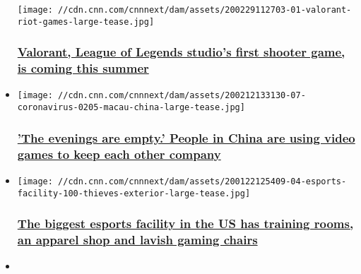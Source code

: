\begin{itemize}
  \texttt{[image: //cdn.cnn.com/cnnnext/dam/assets/200229112703-01-valorant-riot-games-large-tease.jpg]}

  \hypertarget{valorant-league-of-legends-studios-first-shooter-game-is-coming-this-summer}{%
  \subsubsection{\texorpdfstring{\href{/2020/03/02/tech/valorant-league-of-legends-riot-games-shooter/index.html}{Valorant,
  League of Legends studio's first shooter game, is coming this
  summer}}{Valorant, League of Legends studio's first shooter game, is coming this summer}}\label{valorant-league-of-legends-studios-first-shooter-game-is-coming-this-summer}}
\item
  \href{/2020/02/13/intl_business/gaming-china-coronavirus/index.html}{}

  \texttt{[image: //cdn.cnn.com/cnnnext/dam/assets/200212133130-07-coronavirus-0205-macau-china-large-tease.jpg]}

  \hypertarget{the-evenings-are-empty-people-in-china-are-using-video-games-to-keep-each-other-company}{%
  \subsubsection{\texorpdfstring{\href{/2020/02/13/intl_business/gaming-china-coronavirus/index.html}{'The
  evenings are empty.' People in China are using video games to keep
  each other
  company}}{'The evenings are empty.' People in China are using video games to keep each other company}}\label{the-evenings-are-empty-people-in-china-are-using-video-games-to-keep-each-other-company}}
\item
  \href{/2020/01/22/tech/100-thieves-biggest-esports-facility/index.html}{}

  \texttt{[image: //cdn.cnn.com/cnnnext/dam/assets/200122125409-04-esports-facility-100-thieves-exterior-large-tease.jpg]}

  \hypertarget{the-biggest-esports-facility-in-the-us-has-training-rooms-an-apparel-shop-and-lavish-gaming-chairs}{%
  \subsubsection{\texorpdfstring{\href{/2020/01/22/tech/100-thieves-biggest-esports-facility/index.html}{The
  biggest esports facility in the US has training rooms, an apparel shop
  and lavish gaming
  chairs}}{The biggest esports facility in the US has training rooms, an apparel shop and lavish gaming chairs}}\label{the-biggest-esports-facility-in-the-us-has-training-rooms-an-apparel-shop-and-lavish-gaming-chairs}}
\item
  \href{/2019/11/12/sport/esports-g2-league-of-legends-carlos-worlds-spt-intl/index.html}{}


\end{itemize}
